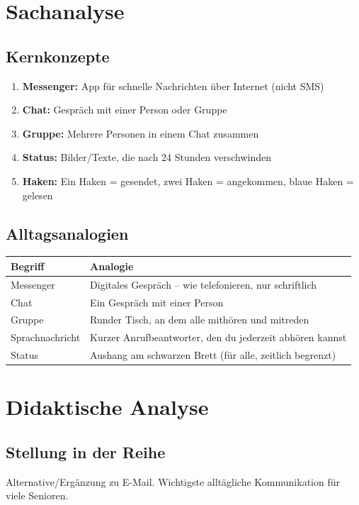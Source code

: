 \documentclass[11pt,a4paper]{article}
\begin{document}
\section{Sachanalyse}

\subsection{Kernkonzepte}
\begin{enumerate}
    \item \textbf{Messenger:} App für schnelle Nachrichten über Internet (nicht SMS)
    \item \textbf{Chat:} Gespräch mit einer Person oder Gruppe
    \item \textbf{Gruppe:} Mehrere Personen in einem Chat zusammen
    \item \textbf{Status:} Bilder/Texte, die nach 24 Stunden verschwinden
    \item \textbf{Haken:} Ein Haken = gesendet, zwei Haken = angekommen, blaue Haken = gelesen
\end{enumerate}

\subsection{Alltagsanalogien}
\begin{tabular}{|l|p{8cm}|}
\hline
\textbf{Begriff} & \textbf{Analogie} \\
\hline
Messenger & Digitales Gespräch -- wie telefonieren, nur schriftlich \\
Chat & Ein Gespräch mit einer Person \\
Gruppe & Runder Tisch, an dem alle mithören und mitreden \\
Sprachnachricht & Kurzer Anrufbeantworter, den du jederzeit abhören kannst \\
Status & Aushang am schwarzen Brett (für alle, zeitlich begrenzt) \\
\hline
\end{tabular}

\section{Didaktische Analyse}

\subsection{Stellung in der Reihe}
Alternative/Ergänzung zu E-Mail. Wichtigste alltägliche Kommunikation für viele Senioren.
\end{document}
